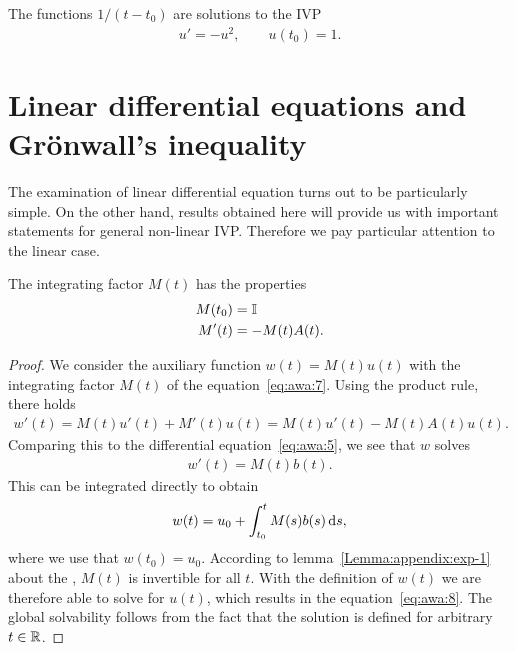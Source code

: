 \begin{example}
  The functions $1/(t-t_0)$ are solutions to the IVP
  \begin{gather*}
    u'=-u^2, \qquad u(t_0) = 1.
  \end{gather*}
\end{example}

\section{Linear differential equations
  and Grönwall's inequality}

\begin{intro}
  The examination of linear differential equation turns out to be
  particularly simple. On the other hand, results obtained here will
  provide us with important statements for general non-linear
  IVP. Therefore we pay particular attention to the linear case.
\end{intro}




\begin{corollary}
  The integrating factor $M(t)$ has the properties
  \begin{align}
    \label{eq:awa:14}
    M(t_0) &= \mathbb I\\
    \label{eq:awa:15}
    M'(t) &= -M(t)A(t).
  \end{align}
\end{corollary}



\begin{proof}
  We consider the auxiliary function $w(t) = M(t) u(t)$ with the
  integrating factor $M(t)$ of the equation~\eqref{eq:awa:7}. Using the
  product rule, there holds
  \begin{gather}
    \label{eq:awa:19}
    w'(t) =  M(t) u'(t) + M'(t) u(t)
    =  M(t) u'(t) - M(t)A(t)u(t).
  \end{gather}
  Comparing this to the differential equation~\eqref{eq:awa:5}, we see
  that $w$ solves
  \begin{gather*}
    w'(t) = M(t) b(t).
  \end{gather*}
	This can be integrated directly to obtain	
  \begin{gather*}
    w(t) = u_0 + \int_{t_0}^t M(s) b(s) \,\mathrm{d} s,
  \end{gather*}
  where we use that $w(t_0) = u_0$.  According to
  lemma~\ref{Lemma:appendix:exp-1} about the , $M(t)$ is invertible for all $t$.  With the
  definition of $w(t)$ we are therefore able to solve for $u(t)$,
  which results in the equation~\eqref{eq:awa:8}. The global
  solvability follows from the fact that the solution is defined for
  arbitrary $t\in \mathbb R$.
\end{proof}

